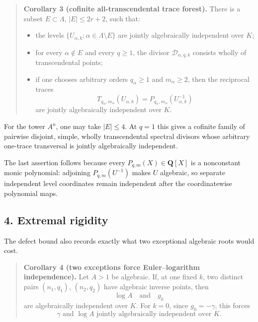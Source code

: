 \begin{quote}
\textbf{Corollary 3 (cofinite all-transcendental trace forest).} There is a
subset \(E\subset\Lambda\), \(|E|\leq2r+2\), such that:

\begin{itemize}
\tightlist
\item
  the levels \(\{U_{\alpha,k}:\alpha\in\Lambda\setminus E\}\) are jointly
  algebraically independent over \(K\);
\item
  for every \(\alpha\notin E\) and every \(q\geq1\), the divisor
  \(\mathcal D_{\alpha,q,k}\) consists wholly of transcendental points;
\item
  if one chooses arbitrary orders \(q_\alpha\geq1\) and
  \(m_\alpha\geq2\), then the reciprocal traces
  \[
   T_{q_\alpha,m_\alpha}(U_{\alpha,k})
   =P_{q_\alpha,m_\alpha}(U_{\alpha,k}^{-1})
  \]
  are jointly algebraically independent over \(K\).
\end{itemize}
\end{quote}

For the tower \(A^n\), one may take \(|E|\leq4\). At \(q=1\) this gives a
cofinite family of pairwise disjoint, simple, wholly transcendental spectral
divisors whose arbitrary one-trace transversal is jointly algebraically
independent.

The last assertion follows because every
\(P_{q,m}(X)\in\mathbf Q[X]\) is a nonconstant monic polynomial: adjoining
\(P_{q,m}(U^{-1})\) makes \(U\) algebraic, so separate independent level
coordinates remain independent after the coordinatewise polynomial maps.

\subsection{4. Extremal rigidity}

The defect bound also records exactly what two exceptional algebraic roots
would cost.

\begin{quote}
\textbf{Corollary 4 (two exceptions force Euler--logarithm independence).}
Let \(A>1\) be algebraic. If, at one fixed \(k\), two distinct pairs
\((n_1,q_1)\), \((n_2,q_2)\) have algebraic inverse points, then
\[
 \log A\quad\text{and}\quad g_k
\]
are algebraically independent over \(K\). For \(k=0\), since
\(g_0=-\gamma\), this forces
\[
 \boxed{\ \gamma\text{ and }\log A
 \text{ jointly algebraically independent over }K.\ }
\]
\end{quote}

